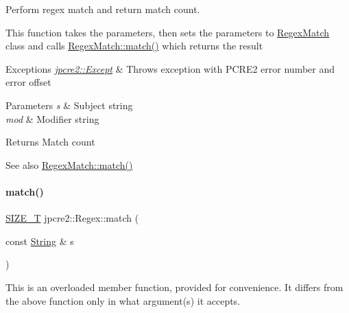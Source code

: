 Perform regex match and return match count. 

This function takes the parameters, then sets the parameters to \hyperlink{classjpcre2_1_1RegexMatch}{Regex\+Match} class and calls \hyperlink{classjpcre2_1_1RegexMatch_a5868aef3a146594ea1ebef34d122bb33_a5868aef3a146594ea1ebef34d122bb33}{Regex\+Match\+::match()} which returns the result 
\begin{DoxyExceptions}{Exceptions}
{\em \hyperlink{classjpcre2_1_1Except}{jpcre2\+::\+Except}} & Throws exception with P\+C\+R\+E2 error number and error offset \\
\hline
\end{DoxyExceptions}

\begin{DoxyParams}{Parameters}
{\em s} & Subject string \\
\hline
{\em mod} & Modifier string \\
\hline
\end{DoxyParams}
\begin{DoxyReturn}{Returns}
Match count 
\end{DoxyReturn}
\begin{DoxySeeAlso}{See also}
\hyperlink{classjpcre2_1_1RegexMatch_a5868aef3a146594ea1ebef34d122bb33_a5868aef3a146594ea1ebef34d122bb33}{Regex\+Match\+::match()} 
\end{DoxySeeAlso}
\hypertarget{classjpcre2_1_1Regex_a9ffbb6aa54cb97125f1b4211bc1d09a5_a9ffbb6aa54cb97125f1b4211bc1d09a5}{}\label{classjpcre2_1_1Regex_a9ffbb6aa54cb97125f1b4211bc1d09a5_a9ffbb6aa54cb97125f1b4211bc1d09a5} 
\paragraph{\texorpdfstring{match()}{match()}\hspace{0.1cm}{\footnotesize\ttfamily [2/2]}}
{\footnotesize\ttfamily \hyperlink{namespacejpcre2_a2aac465ddcb123560c7c8215dd69246c}{S\+I\+Z\+E\+\_\+T} jpcre2\+::\+Regex\+::match (\begin{DoxyParamCaption}\item[{const \hyperlink{namespacejpcre2_a91f03070152fb228bc116c5a737f1d16}{String} \&}]{s }\end{DoxyParamCaption})\hspace{0.3cm}{\ttfamily [inline]}}



This is an overloaded member function, provided for convenience. It differs from the above function only in what argument(s) it accepts. 


